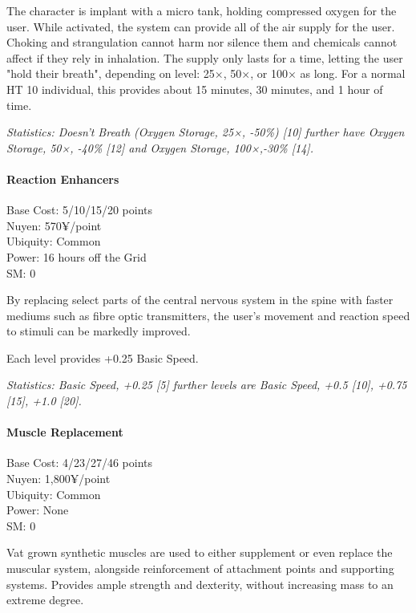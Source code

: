 \begin{multicols*}{3}
	The character is implant with a micro tank, holding compressed oxygen for the user. While activated, the system can provide all of the air supply for the user. Choking and strangulation cannot harm nor silence them and chemicals cannot affect if they rely in inhalation. The supply only lasts for a time, letting the user "hold their breath", depending on level: 25×, 50×, or 100× as long. For a normal HT 10 individual, this provides about 15 minutes, 30 minutes, and 1 hour of time.
	
	\textit{\textcolor{OliveGreen}{Statistics: Doesn't Breath (Oxygen Storage, 25×, -50\%) [10] further have Oxygen Storage, 50×, -40\% [12] and Oxygen Storage, 100×,-30\% [14].}}
	
	\paragraph{Reaction Enhancers}
	\begin{flushright}
		Base Cost: 5/10/15/20 points\\
		Nuyen: 570¥/point\\
		Ubiquity: Common\\
		Power: 16 hours off the Grid\\
		SM: 0
	\end{flushright}
	
	By replacing select parts of the central nervous system in the spine with faster mediums such as fibre optic transmitters, the user's movement and reaction speed to stimuli can be markedly improved.
	
	Each level provides +0.25 Basic Speed.
	
	\textit{\textcolor{OliveGreen}{Statistics: Basic Speed, +0.25 [5] further levels are Basic Speed, +0.5 [10], +0.75 [15], +1.0 [20].}}
	
	\paragraph{Muscle Replacement}
	\begin{flushright}
		Base Cost: 4/23/27/46 points\\
		Nuyen: 1,800¥/point\\
		Ubiquity: Common\\
		Power: None\\
		SM: 0
	\end{flushright}
	
	Vat grown synthetic muscles are used to either supplement or even replace the muscular system, alongside reinforcement of attachment points and supporting systems. Provides ample strength and dexterity, without increasing mass to an extreme degree.
	

\end{multicols*}
